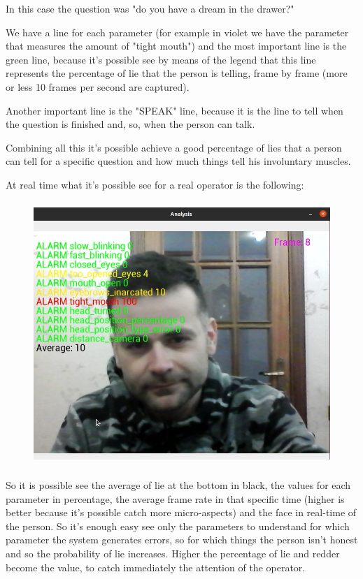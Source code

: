 \documentclass[12pt]{article}
\begin{document}
In this case the question was "do you have a dream in the drawer?"

We have a line for each parameter (for example in violet we have the parameter that measures the amount of "tight mouth") and the most important line is the green line, because it's possible see by means of the legend that this line represents the percentage of lie that the person is telling, frame by frame (more or less 10 frames per second are captured).

Another important line is the "SPEAK" line, because it is the line to tell when the question is finished and, so, when the person can talk.

Combining all this it's possible achieve a good percentage of lies that a person can tell for a specific question and how much things tell his involuntary muscles.

At real time what it's possible see for a real operator is the following:

\begin{figure}[H]

    \includegraphics[height=10cm]{./Screenshot.png}

\end{figure}

So it is possible see the average of lie at the bottom in black, the values for each parameter in percentage, the average frame rate in that specific time (higher is better because it's possible catch more micro-aspects) and the face in real-time of the person. So it's enough easy see only the parameters to understand for which parameter the system generates errors, so for which things the person isn't honest and so the probability of lie increases. Higher the percentage of lie and redder become the value, to catch immediately the attention of the operator.
\end{document}
